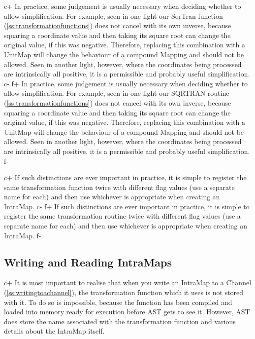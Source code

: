 \documentclass[twoside,11pt]{article}
\newcommand{\secref}[1]{\S\ref{#1}}
\renewcommand{\secref}[1]{\ref{#1}}
\begin{document}
c+
In practice, some judgement is usually necessary when deciding whether
to allow simplification. For example, seen in one light our SqrTran
function (\secref{ss:transformationfunctions}) does not cancel with
its own inverse, because squaring a coordinate value and then taking
its square root can change the original value, if this was
negative. Therefore, replacing this combination with a UnitMap will
change the behaviour of a compound Mapping and should not be
allowed. Seen in another light, however, where the coordinates being
processed are intrinsically all positive, it is a permissible and
probably useful simplification.
c-
f+
In practice, some judgement is usually necessary when deciding whether
to allow simplification. For example, seen in one light our SQRTRAN
routine (\secref{ss:transformationfunctions}) does not cancel with its
own inverse, because squaring a coordinate value and then taking its
square root can change the original value, if this was
negative. Therefore, replacing this combination with a UnitMap will
change the behaviour of a compound Mapping and should not be
allowed. Seen in another light, however, where the coordinates being
processed are intrinsically all positive, it is a permissible and
probably useful simplification.
f-

c+
If such distinctions are ever important in practice, it is simple to
register the same transformation function twice with different flag
values (use a separate name for each) and then use whichever is
appropriate when creating an IntraMap.
c-
f+
If such distinctions are ever important in practice, it is simple to
register the same transformation routine twice with different flag
values (use a separate name for each) and then use whichever is
appropriate when creating an IntraMap.
f-

\subsection{\label{ss:readingandwritingintramaps}Writing and Reading IntraMaps}

c+
It is most important to realise that when you write an IntraMap to a
Channel (\secref{ss:writingtoachannel}), the transformation function
which it uses is not stored with it. To do so is impossible, because
the function has been compiled and loaded into memory ready for
execution before AST gets to see it. However, AST does store the name
associated with the transformation function and various details about
the IntraMap itself.
\end{document}
